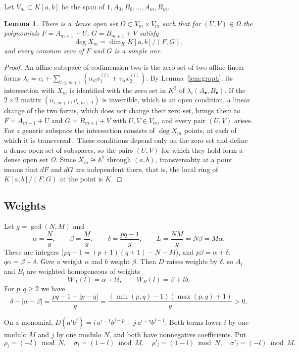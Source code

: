 \documentclass[11pt]{amsart}
\newtheorem{lemma}[theorem]{Lemma}
\theoremstyle{definition}
\theoremstyle{remark}
\numberwithin{equation}{section}
\newcommand{\A}{\mathbb{A}}
\begin{document}
Let $V_m\subset K[a,b]$ be the span of $1,A_0,B_0,\dots,A_m,B_m$.

\begin{lemma}\label{lem:degcount}
There is a dense open set $\Omega\subset V_m\times V_m$ such that for $(U,V)\in\Omega$ the polynomials $F=A_{m+1}+U$, $G=B_{m+1}+V$ satisfy
\[
\deg X_m=\dim_K K[a,b]/(F,G),
\]
and every common zero of $F$ and $G$ is a simple one.
\end{lemma}

\begin{proof}
An affine subspace of codimension two is the zero set of two affine linear forms $\lambda_i=c_{i}+\sum_{l\le m+1}(u_{il}x_1^{(l)}+v_{il}x_2^{(l)})$. By Lemma~\ref{lem:graph}, its intersection with $X_m$ is identified with the zero set in $K^2$ of $\lambda_i(A_\bullet,B_\bullet)$. If the $2\times2$ matrix $(u_{i,m+1},v_{i,m+1})$ is invertible, which is an open condition, a linear change of the two forms, which does not change their zero set, brings them to $F=A_{m+1}+U$ and $G=B_{m+1}+V$ with $U,V\in V_m$, and every pair $(U,V)$ arises. For a generic subspace the intersection consists of $\deg X_m$ points, at each of which it is transversal \cite[Lectures~17 and~18]{Har92}. These conditions depend only on the zero set and define a dense open set of subspaces, so the pairs $(U,V)$ for which they hold form a dense open set $\Omega$. Since $X_m\cong\A^2$ through $(a,b)$, transversality at a point means that $dF$ and $dG$ are independent there, that is, the local ring of $K[a,b]/(F,G)$ at the point is $K$.
\end{proof}

\subsection{Weights}
Let $g=\gcd(N,M)$ and
\[
\alpha=\frac{N}{g},\qquad \beta=\frac{M}{g},\qquad \delta=\frac{pq-1}{g},\qquad L=\frac{NM}{g}=N\beta=M\alpha .
\]
These are integers ($pq-1=(p+1)(q+1)-N-M$), and $p\beta=\alpha+\delta$, $q\alpha=\beta+\delta$. Give $a$ weight $\alpha$ and $b$ weight $\beta$. Then $D$ raises weights by $\delta$, so $A_l$ and $B_l$ are weighted homogeneous of weights
\[
W_A(l)=\alpha+l\delta,\qquad W_B(l)=\beta+l\delta .
\]
For $p,q\ge2$ we have
\begin{equation}\label{eq:deltabig}
\delta-|\alpha-\beta|=\frac{pq-1-|p-q|}{g}=\frac{(\min(p,q)-1)(\max(p,q)+1)}{g}>0 .
\end{equation}

On a monomial, $D(a^ib^j)=i\,a^{i-1}b^{j+p}+j\,a^{i+q}b^{j-1}$. Both terms lower $i$ by one modulo $M$ and $j$ by one modulo $N$, and both have nonnegative coefficients. Put
\[
\rho_l=(-l)\bmod N,\quad \sigma_l=(1-l)\bmod M,\quad \rho'_l=(1-l)\bmod N,\quad \sigma'_l=(-l)\bmod M .
\]
\end{document}
